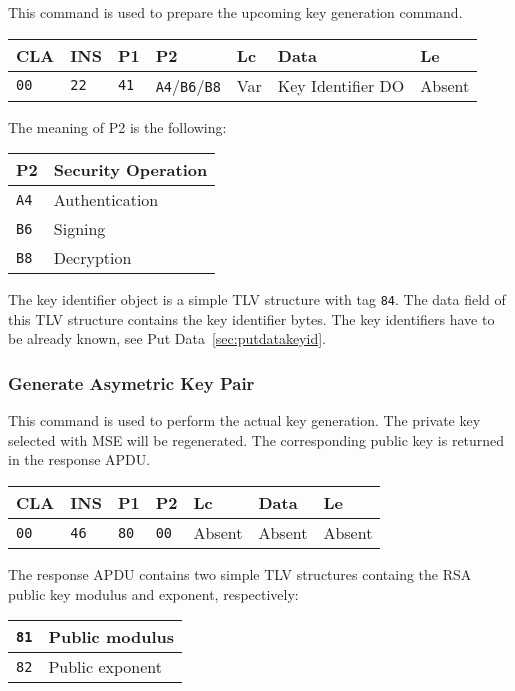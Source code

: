 \documentclass{article}
\begin{document}
This command is used to prepare the upcoming key generation command.
\begin{flushleft}
\begin{tabular}{|l|l|l|l|l|l|l|}
\hline
CLA & INS & P1 & P2 & Lc & Data & Le \\
\hline
\texttt{00} & \texttt{22} & \texttt{41} & \texttt{A4}/\texttt{B6}/\texttt{B8} &
Var & Key Identifier DO & Absent \\
\hline
\end{tabular}
\end{flushleft}
The meaning of P2 is the following:
\begin{flushleft}
\begin{tabular}{|l|l|}
\hline
P2 & Security Operation \\
\hline
\texttt{A4} & Authentication \\
\texttt{B6} & Signing \\
\texttt{B8} & Decryption \\
\hline
\end{tabular}
\end{flushleft}
The key identifier object is a
simple TLV structure with tag \texttt{84}. The data field of this TLV
structure contains the key identifier bytes. The key identifiers have
to be already known, see Put Data~\ref{sec:putdatakeyid}.

\subsubsection{Generate Asymetric Key Pair}

This command is used to perform the actual key generation. The private key selected with
MSE will be regenerated. The corresponding public key is returned in the response APDU.
\begin{flushleft}
\begin{tabular}{|l|l|l|l|l|l|l|}
\hline
CLA & INS & P1 & P2 & Lc & Data & Le \\
\hline
\texttt{00} & \texttt{46} & \texttt{80} & \texttt{00} &
Absent & Absent & Absent \\
\hline
\end{tabular}
\end{flushleft}
The response APDU contains two simple TLV structures containg the RSA public key modulus
and exponent, respectively:
\begin{flushleft}
\begin{tabular}{|l|l|}
\hline
\texttt{81} & Public modulus \\
\hline
\texttt{82} & Public exponent \\
\hline
\end{tabular}
\end{flushleft}
\end{document}
